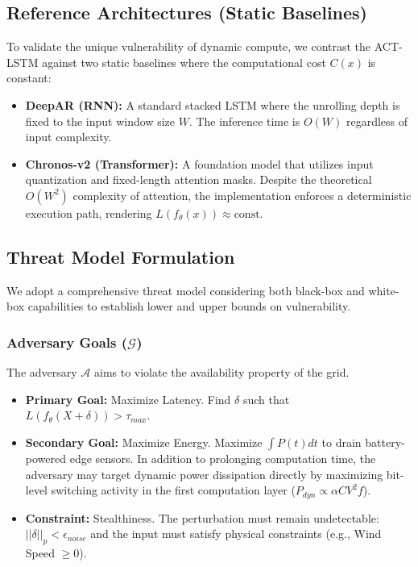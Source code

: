 \subsection{Reference Architectures (Static Baselines)}
To validate the unique vulnerability of dynamic compute, we contrast the ACT-LSTM against two static baselines where the computational cost $C(x)$ is constant:
\begin{itemize}
    \item \textbf{DeepAR (RNN):} A standard stacked LSTM where the unrolling depth is fixed to the input window size $W$. The inference time is $O(W)$ regardless of input complexity.
    \item \textbf{Chronos-v2 (Transformer):} A foundation model that utilizes input quantization and fixed-length attention masks. Despite the theoretical $O(W^2)$ complexity of attention, the implementation enforces a deterministic execution path, rendering $L(f_\theta(x)) \approx \text{const}$.
\end{itemize}

\subsection{Threat Model Formulation}
We adopt a comprehensive threat model considering both black-box and white-box capabilities to establish lower and upper bounds on vulnerability.

\subsubsection{Adversary Goals ($\mathcal{G}$)}
The adversary $\mathcal{A}$ aims to violate the availability property of the grid.
\begin{itemize}
    \item \textbf{Primary Goal:} Maximize Latency. Find $\delta$ such that $L(f_\theta(X + \delta)) > \tau_{max}$.
    \item \textbf{Secondary Goal:} Maximize Energy. Maximize $\int P(t) dt$ to drain battery-powered edge sensors. In addition to prolonging computation time, the adversary may target dynamic power dissipation directly by maximizing bit-level switching activity in the first computation layer ($P_{dyn} \propto \alpha C V^2 f$).
    \item \textbf{Constraint:} Stealthiness. The perturbation must remain undetectable: $||\delta||_p < \epsilon_{noise}$ and the input must satisfy physical constraints (e.g., Wind Speed $\ge 0$).
\end{itemize}

